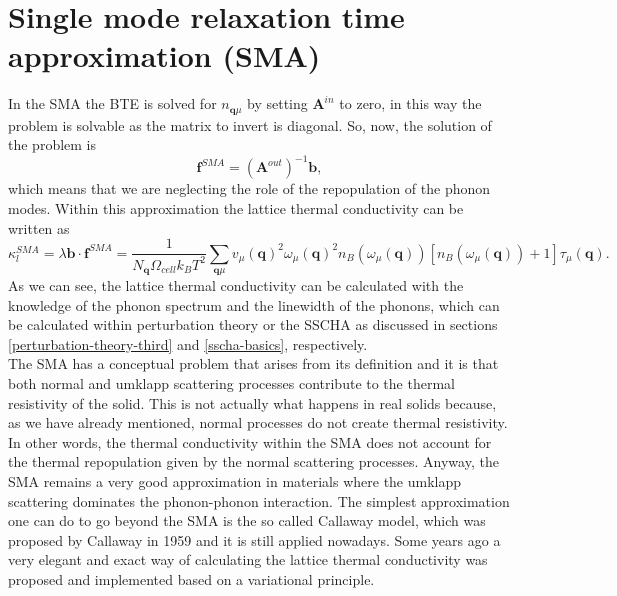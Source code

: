 \section{Single mode relaxation time approximation (SMA)}

In the SMA the BTE is solved for $n_{\mathbf{q}\mu}$ by setting $\mathbf{A}^{in}$ to zero, in this way the problem is solvable as the matrix to invert is diagonal. So, now, the solution of the problem is
\begin{equation}
 \mathbf{f}^{SMA}=(\mathbf{A}^{out})^{-1}\mathbf{b},
\end{equation}
which means that we are neglecting the role of the repopulation of the phonon modes. Within this approximation the lattice thermal conductivity can be written as
\begin{equation}
 \kappa_{l}^{SMA}=\lambda\mathbf{b}\cdot\mathbf{f}^{SMA}=\frac{1}{N_{\mathbf{q}}\Omega_{cell} k_{B}T^{2}}\sum_{\mathbf{q}\mu}v_{\mu}(\mathbf{q})^{2}\omega_{\mu}(\mathbf{q})^{2}n_{B}(\omega_{\mu}(\mathbf{q}))[n_{B}(\omega_{\mu}(
 \mathbf{q}))+1]\tau_{\mu}(\mathbf{q}).
\end{equation}
As we can see, the lattice thermal conductivity can be calculated with the knowledge of the phonon spectrum and the linewidth of the phonons, which can be calculated within perturbation theory or the SSCHA as discussed 
in sections \ref{perturbation-theory-third} and \ref{sscha-basics}, respectively. \\

The SMA has a conceptual problem that arises from its definition and it is that both normal and umklapp scattering processes contribute to the thermal 
resistivity of the solid. This is not actually what happens in real solids because, as we have already mentioned, normal processes do not create thermal resistivity. In other words, the thermal conductivity within the SMA does not 
account for the thermal repopulation given by the normal scattering processes. Anyway, the SMA remains a very good approximation in materials where the umklapp scattering dominates the phonon-phonon interaction. The simplest 
approximation one can do to go beyond the SMA is the so called Callaway model\cite{callaway1959model}, which was proposed by Callaway in 1959 and it is still applied nowadays. Some years ago a very elegant and exact way of 
calculating the lattice thermal conductivity was proposed\cite{fugallo2013ab} and implemented based on a variational principle. \\

